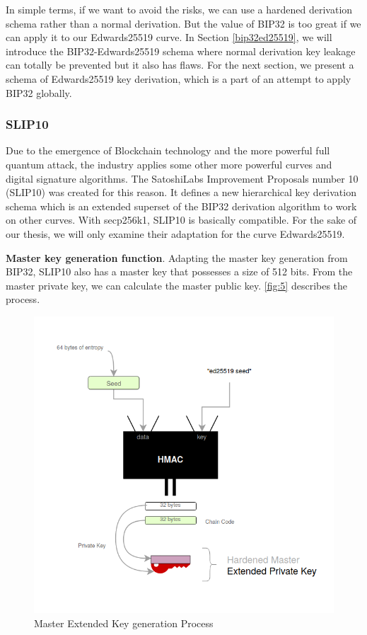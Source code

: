 \begin{adjustwidth}{1cm}{}
    In simple terms, if we want to avoid the risks, we can use a hardened derivation schema rather than a normal derivation. But the value of BIP32 is too great if we can apply it to our Edwards25519 curve. In Section \ref{bip32ed25519}, we will introduce the BIP32-Edwards25519 schema where normal derivation key leakage can totally be prevented but it also has flaws. For the next section, we present a schema of Edwards25519 key derivation, which is a part of an attempt to apply BIP32 globally.
\end{adjustwidth}

\subsubsection{SLIP10}
\label{SLIP10}

Due to the emergence of Blockchain technology and the more powerful full quantum attack, the industry applies some other more powerful curves and digital signature algorithms. The SatoshiLabs Improvement Proposals number 10 (SLIP10) \cite{github/slip0010} was created for this reason. It defines a new hierarchical key derivation schema which is an extended superset of the BIP32 derivation algorithm to work on other curves. With secp256k1, SLIP10 is basically compatible. For the sake of our thesis, we will only examine their adaptation for the curve Edwards25519.

\bigskip
{\textbf{Master key generation function}}. Adapting the master key generation from BIP32, SLIP10 also has a master key that possesses a size of 512 bits. From the master private key, we can calculate the master public key.
\autoref{fig:5} describes the process.

\bigskip
\begin{figure}[ht!]
    \centering
    \includegraphics[width=1\textwidth]{images/master_slip10.png}
    \caption[Master Extended Key generation Process]{Master Extended Key generation Process}
    \label{fig:5}
\end{figure}

